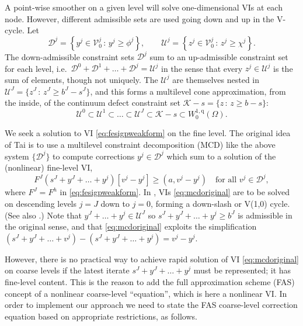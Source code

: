 \documentclass[letterpaper,final,12pt,reqno]{amsart}
\theoremstyle{claim}
\newcommand{\qq}{{\text{q}}}
\numberwithin{equation}{section}
\numberwithin{figure}{section}
\numberwithin{table}{section}
\numberwithin{theorem}{section}
\begin{document}
A point-wise smoother on a given level will solve one-dimensional VIs at each node.  However, different admissible sets are used going down and up in the V-cycle.  Let
\begin{equation}
\mathcal{D}^j = \left\{y^j \in \mathcal{V}_0^j \,:\, y^j \ge \phi^j\right\}, \qquad \mathcal{U}^j = \left\{z^j \in \mathcal{V}_0^j \,:\, z^j \ge \chi^j\right\}. \label{eq:downupsets}
\end{equation}
The down-admissible constraint sets $\mathcal{D}^j$ sum to an up-admissible constraint set for each level, i.e.~$\mathcal{D}^0 + \mathcal{D}^1 + \dots + \mathcal{D}^j = \mathcal{U}^j$ in the sense that every $z^j \in \mathcal{U}^j$ is the sum of elements, though not uniquely.  The $\mathcal{U}^j$ are themselves nested in $\mathcal{U}^J= \{z^J \,:\, z^J \ge b^J - s^J\}$, and this forms a multilevel cone approximation, from the inside, of the continuum defect constraint set $\mathcal{K} - s = \{z\,:\,z \ge b - s\}$:
\begin{equation}
\mathcal{U}^0 \subset \mathcal{U}^1 \subset \dots \subset \mathcal{U}^J \subset \mathcal{K} - s \subset W_0^{1,\qq}(\Omega). \label{eq:innerconeapprox}
\end{equation}

We seek a solution to VI \eqref{eq:fesigpweakform} on the fine level.  The original idea of Tai \cite{Tai2003} is to use a multilevel constraint decomposition (MCD) like the above  system $\{\mathcal{D}^j\}$ to compute corrections $y^j \in \mathcal{D}^j$ which sum to a solution of the (nonlinear) fine-level VI,
\begin{equation}
F^J(s^J + y^J + \dots + y^j)[v^j - y^j] \ge (a,v^j - y^j) \quad \text{for all } v^j \in \mathcal{D}^j, \label{eq:mcdoriginal}
\end{equation}
where $F^J = F^h$ in \eqref{eq:fesigpweakform}.  In \cite{Tai2003}, VIs \eqref{eq:mcdoriginal} are to be solved on descending levels $j=J$ down to $j=0$, forming a down-slash or V(1,0) cycle.  (See also \cite[Algorithm 4.7]{GraeserKornhuber2009}.)  Note that $y^J + \dots + y^j \in \mathcal{U}^J$ so $s^J + y^J + \dots + y^j \ge b^J$ is admissible in the original sense, and that \eqref{eq:mcdoriginal} exploits the simplification $(s^J + y^J + \dots + v^j) - (s^J + y^J + \dots + y^j) = v^j - y^j$.

However, there is no practical way to achieve rapid solution of VI \eqref{eq:mcdoriginal} on coarse levels if the latest iterate $s^J + y^J + \dots + y^j$ must be represented; it has fine-level content.  This is the reason to add the full approximation scheme (FAS) \cite{Trottenbergetal2001} concept of a nonlinear coarse-level ``equation'', which is here a nonlinear VI.  In order to implement our approach we need to state the FAS coarse-level correction equation based on appropriate restrictions, as follows.
\end{document}
